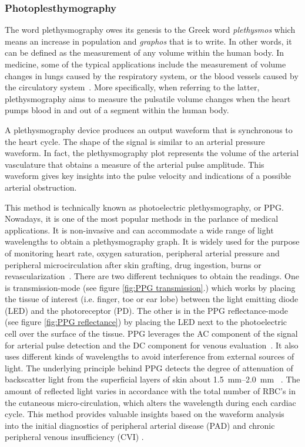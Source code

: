 \subsubsection{Photoplesthymography}
\label{section literature PPG}
The word plethysmography owes its genesis to the Greek word \textit{plethysmos} which means an increase in population and \textit{graphos} that is to write. In other words, it can be defined as the measurement of any volume within the human body. In medicine, some of the typical applications include the measurement of volume changes in lungs caused by the respiratory system, or the blood vessels caused by the circulatory system~\cite{turcott2004methods}. More specifically, when referring to the latter, plethysmography aims to measure the pulsatile volume changes when the heart pumps blood in and out of a segment within the human body. 

A plethysmography device produces an output waveform that is synchronous to the heart cycle. The shape of the signal is similar to an arterial pressure waveform. In fact, the plethysmography plot represents the volume of the arterial vasculature that obtains a measure of the arterial pulse amplitude. This waveform gives key insights into the pulse velocity and indications of a possible arterial obstruction.

This method is technically known as photoelectric plethysmography, or PPG. Nowadays, it is one of the most popular methods in the parlance of medical applications. It is non-invasive and can accommodate a wide range of light wavelengths to obtain a plethysmography graph. It is widely used for the purpose of monitoring heart rate, oxygen saturation, peripheral arterial pressure and peripheral microcirculation after skin grafting, drug ingestion, burns or revascularization~\cite{holohan1996plethysmography}. There are two different techniques to obtain the readings. One is transmission-mode (see figure \ref{fig:PPG transmission}.) which works by placing the tissue of interest (i.e. finger, toe or ear lobe) between the light emitting diode (LED) and the photoreceptor (PD). The other is in the PPG reflectance-mode (see figure \ref{fig:PPG reflectance}) by placing the LED next to the photoelectric cell over the surface of the tissue. PPG leverages the AC component of the signal for arterial pulse detection and the DC component for venous evaluation~\cite{higgins1986photoplethysmographic}. It also uses different kinds of wavelengths to avoid interference from external sources of light. The underlying principle behind PPG detects the degree of attenuation of backscatter light from the superficial layers of skin about \SIrange{1.5}{2.0}{\milli\meter} ~\cite{holohan1996plethysmography,bashkatov2005optical,kim1986pulse}. The amount of reflected light varies in accordance with the total number of RBC's in the cutaneous micro-circulation, which alters the wavelength during each cardiac cycle. This method provides valuable insights based on the waveform analysis into the initial diagnostics of peripheral arterial disease (PAD) \cite{allen1993development, williams2005evaluation, alnaeb2007optical} and chronic peripheral venous insufficiency (CVI) \cite{eberhardt2005chronic,norris1983quantitative}.


